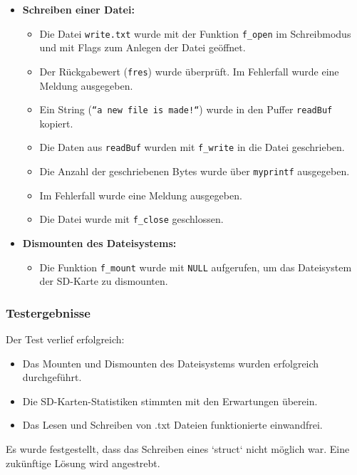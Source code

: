 \begin{itemize}
	\item \textbf{Schreiben einer Datei:}
	\begin{itemize}
		\item Die Datei \texttt{write.txt} wurde mit der Funktion \texttt{f\_open} im Schreibmodus und mit Flags zum Anlegen der Datei geöffnet.
		\item Der Rückgabewert (\texttt{fres}) wurde überprüft. Im Fehlerfall wurde eine Meldung ausgegeben.
		\item Ein String (\texttt{``a new file is made!``}) wurde in den Puffer \texttt{readBuf} kopiert.
		\item Die Daten aus \texttt{readBuf} wurden mit \texttt{f\_write} in die Datei geschrieben.
		\item Die Anzahl der geschriebenen Bytes wurde über \texttt{myprintf} ausgegeben.
		\item Im Fehlerfall wurde eine Meldung ausgegeben.
		\item Die Datei wurde mit \texttt{f\_close} geschlossen.
	\end{itemize}
	
	\item \textbf{Dismounten des Dateisystems:}
	\begin{itemize}
		\item Die Funktion \texttt{f\_mount} wurde mit \texttt{NULL} aufgerufen, um das Dateisystem der SD-Karte zu dismounten.
	\end{itemize}
\end{itemize}

\subsubsection{Testergebnisse}
Der Test verlief erfolgreich:

\begin{itemize}
	\item Das Mounten und Dismounten des Dateisystems wurden erfolgreich durchgeführt.
	\item Die SD-Karten-Statistiken stimmten mit den Erwartungen überein.
	\item Das Lesen und Schreiben von .txt Dateien funktionierte einwandfrei.
\end{itemize}

Es wurde festgestellt, dass das Schreiben eines `struct` nicht möglich war. Eine zukünftige Lösung wird angestrebt.
